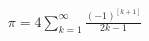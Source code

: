 \documentclass[preview]{standalone}
\begin{document}
\begin{align*}
\pi  = 4  \sum _{k=1}^{ \infty } \frac{ (-1)^[k+1] }{  2k - 1  }
\end{align*}
\end{document}
